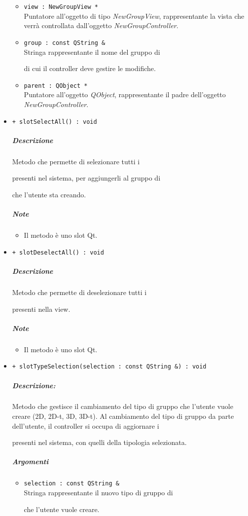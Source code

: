 \begin{itemize}
\begin{itemize}
				\item \color{RoyalPurple} \verb!view : NewGroupView *!\\				
\color{black} Puntatore all'oggetto di tipo \textsl{NewGroupView}, rappresentante la vista che verrà controllata dall'oggetto \textsl{NewGroupController}.
				\item \color{RoyalPurple} \verb!group : const QString &!\\				
\color{black} Stringa rappresentante il nome del gruppo di \subject{} di cui il controller deve gestire le modifiche.
				\item \color{RoyalPurple} \verb!parent : QObject *!\\				
\color{black} Puntatore all'oggetto \textsl{QObject}, rappresentante il padre dell'oggetto \textsl{NewGroupController}.
			\end{itemize}
			\item \color{blue} \verb!+ slotSelectAll() : void!
			\color{black}
			\subparagraph{Descrizione} Metodo che permette di selezionare tutti i \subject{} presenti nel sistema, per aggiungerli al gruppo di \subject{} che l'utente sta creando.
			\subparagraph{Note}
			\begin{itemize}
				\item Il metodo è uno slot\g{} Qt\g{}.
			\end{itemize}
			\item \color{blue} \verb!+ slotDeselectAll() : void!
			\color{black}
			\subparagraph{Descrizione} Metodo che permette di deselezionare tutti i \subject{} presenti nella view.
			\subparagraph{Note}
			\begin{itemize}
				\item Il metodo è uno slot\g{} Qt\g{}.
			\end{itemize}
			\item \color{blue} \verb!+ slotTypeSelection(selection : const QString &) : void!
			\color{black}
			\subparagraph{Descrizione:} Metodo che gestisce il cambiamento del tipo di gruppo che l'utente vuole creare (2D, 2D-t, 3D, 3D-t). Al cambiamento del tipo di gruppo da parte dell'utente, il controller si occupa di aggiornare i \subject{} presenti nel sistema, con quelli della tipologia selezionata.
			\color{black}
			\subparagraph{Argomenti}
			\begin{itemize}
				\item \color{RoyalPurple} \verb!selection : const QString &!\\				
\color{black} Stringa rappresentante il nuovo tipo di gruppo di \subject{} che l'utente vuole creare.

\end{itemize}
\end{itemize}
